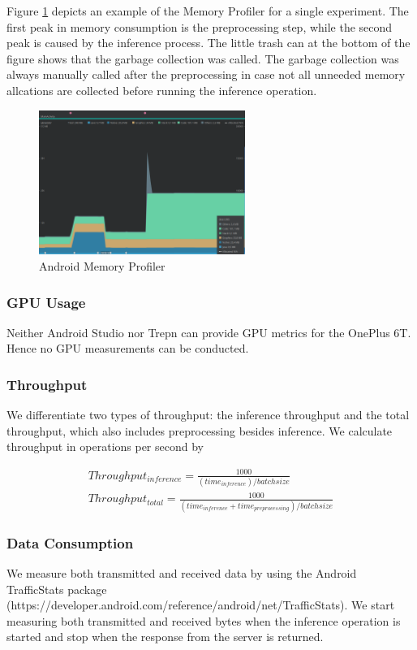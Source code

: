 Figure \ref{fig:prof_mem} depicts an example of the Memory Profiler for a single experiment. The first peak in memory consumption is the preprocessing step, while the second peak is caused by the inference process.
The little trash can at the bottom of the figure shows that the garbage collection was called. The garbage collection was always manually called after the preprocessing in case not all unneeded memory allcations are collected before running the inference operation. 
\begin{figure}[H]
\centering
\includegraphics[width=0.6\textwidth]{./Bilder/profiler_MEM}
\caption{Android Memory Profiler}
\label{fig:prof_mem}
\end{figure}
\subsubsection{GPU Usage}
Neither Android Studio nor Trepn can provide GPU metrics for the OnePlus 6T. Hence no GPU measurements can be conducted.
\subsubsection{Throughput}
We differentiate two types of throughput: the inference throughput and the total throughput, which also includes preprocessing besides inference.
We calculate throughput in operations per second by 

\begin{equation*}
\begin{gathered}
Throughput_{inference} =\frac{1000}{(time_{inference}) / batchsize}\\
Throughput_{total}  =\frac{1000}{(time_{inference} + time_{preprocessing}) / batchsize}
\end{gathered}
\end{equation*}
\subsubsection{Data Consumption}
We measure both transmitted and received data by using the Android TrafficStats package (https://developer.android.com/reference/android/net/TrafficStats). We start measuring both transmitted and received bytes when the inference operation is started and stop when the response from the server is returned. 
